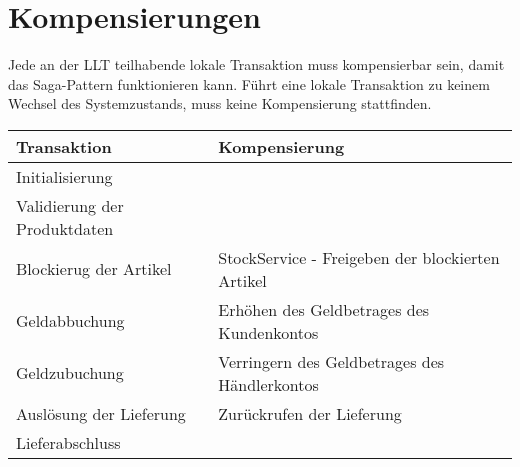 \section{Kompensierungen}

Jede an der LLT teilhabende lokale Transaktion muss kompensierbar sein, damit das Saga-Pattern funktionieren kann. Führt eine lokale Transaktion zu keinem Wechsel des Systemzustands, muss keine Kompensierung stattfinden.

\begin{center}
	\begin{tabular}[h]{|p{5cm}|p{9.5cm}|}
		\hline
		Transaktion & Kompensierung \\ \hline
		Initialisierung & \\ \hline
		Validierung der Produktdaten & \\ \hline
		Blockierug der Artikel & StockService - Freigeben der blockierten Artikel \\ \hline
		Geldabbuchung & Erhöhen des Geldbetrages des Kundenkontos \\ \hline
		Geldzubuchung & Verringern des Geldbetrages des Händlerkontos \\ \hline
		Auslösung der Lieferung & Zurückrufen der Lieferung \\ \hline
		Lieferabschluss & \\ \hline
	\end{tabular}
\end{center}
